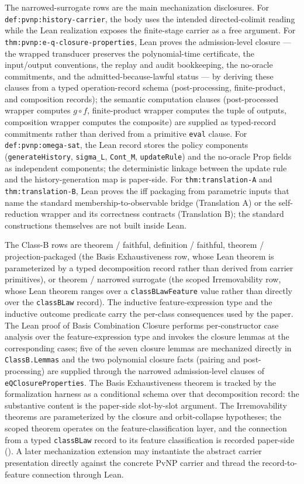 \documentclass[11pt]{article}
\theoremstyle{definition}
\begin{document}
The narrowed-surrogate rows are the main mechanization disclosures.
For \texttt{def:pvnp:\allowbreak history-carrier}, the body uses the
intended directed-colimit reading while the Lean realization exposes
the finite-stage carrier as a free argument.  For
\texttt{thm:pvnp:\allowbreak e-q-\allowbreak closure-properties}, Lean proves
the admission-level closure --- the wrapped transducer preserves the
polynomial-time certificate, the input/output conventions, the replay
and audit bookkeeping, the no-oracle commitments, and the
admitted-because-lawful status --- by deriving these clauses from a
typed operation-record schema (post-processing, finite-product, and
composition records); the semantic computation clauses (post-processed
wrapper computes \(g\circ f\), finite-product wrapper computes the
tuple of outputs, composition wrapper computes the composite) are
supplied as typed-record commitments rather than derived from a
primitive \texttt{eval} clause.  For \texttt{def:pvnp:\allowbreak omega-sat}, the Lean
record stores the policy components (\texttt{generateHistory},
\texttt{sigma\_L}, \texttt{Cont\_M}, \texttt{updateRule}) and the
no-oracle Prop fields as independent components; the deterministic
linkage between the update rule and the history-generation map is
paper-side.  For \texttt{thm:translation-A} and
\texttt{thm:translation-B}, Lean proves the iff packaging from
parametric inputs that name the standard membership-to-observable
bridge (Translation A) or the self-reduction wrapper and its
correctness contracts (Translation B); the standard constructions
themselves are not built inside Lean.

The Class-B rows are theorem / faithful, definition / faithful,
theorem / projection-packaged (the Basis Exhaustiveness row, whose
Lean theorem is parameterized by a typed decomposition record rather
than derived from carrier primitives), or theorem / narrowed surrogate
(the scoped Irremovability row, whose Lean theorem ranges over a
\texttt{classBLawFeature} value rather than directly over the
\texttt{classBLaw} record).  The inductive feature-expression type and
the inductive outcome predicate carry the per-class consequences used
by the paper.  The Lean proof of Basis Combination Closure performs
per-constructor case analysis over the feature-expression type and
invokes the closure lemmas at the corresponding cases; five of the
seven closure lemmas are mechanized directly in
\texttt{ClassB.Lemmas} and the two polynomial closure facts (pairing
and post-processing) are supplied through the narrowed admission-level
clauses of \texttt{eQClosureProperties}.  The Basis
Exhaustiveness theorem is tracked by the formalization harness as a
conditional schema over that decomposition record: the substantive
content is the paper-side slot-by-slot argument.  The Irremovability
theorems are parameterized by the closure and orbit-collapse
hypotheses; the scoped theorem operates on the feature-classification
layer, and the connection from a typed \texttt{classBLaw} record to
its feature classification is recorded paper-side ().
A later mechanization extension may instantiate the abstract carrier
presentation directly against the concrete PvNP carrier and thread
the record-to-feature connection through Lean.
\end{document}
